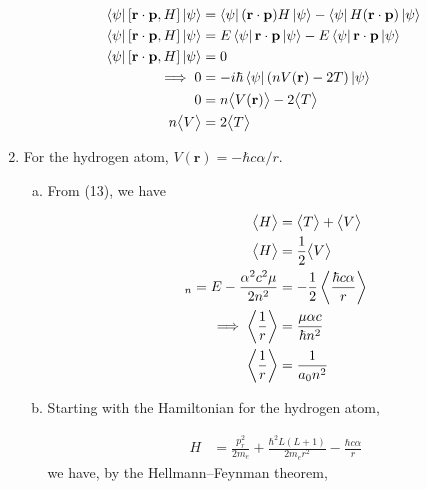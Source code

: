 \documentclass[]{article}
\begin{document}
\begin{enumerate}[1)]
\begin{equation}
\begin{split}
\bra{\psi}\left[ \textbf{r}\cdot\textbf{p}, H  \right]\ket{\psi} & =  \bra{\psi}(\textbf{r}\cdot\textbf{p})H\ket{\psi}   -  \bra{\psi}H(\textbf{r}\cdot\textbf{p})\ket{\psi}  \\
\bra{\psi}\left[ \textbf{r}\cdot\textbf{p}, H  \right]\ket{\psi} & = E\bra{\psi}\textbf{r}\cdot\textbf{p}\ket{\psi}   -  E\bra{\psi}\textbf{r}\cdot\textbf{p}\ket{\psi}  \\
\bra{\psi}\left[ \textbf{r}\cdot\textbf{p}, H  \right]\ket{\psi} & = 0\\
\implies 0 & = -i\hbar \bra{\psi}\left( nV(\textbf{r})  -2 T \right) \ket{\psi}\\
0 & = n \big< V(\textbf{r}) \big> -2 \big<  T \big> \\
 n \big< V \big> & = 2 \big<  T \big>
\end{split}
\end{equation}

\item For the hydrogen atom, $V(\textbf{r}) = -\hbar c\alpha/r$.
\begin{enumerate}[a)]
\item From (13), we have

\begin{equation}
\begin{split}
\big< H \big> & = \big< T \big>  +  \big<  V \big> \\
\big< H \big> & = \frac{1}{2} \big<  V \big> \\
_n = E-\frac{\alpha^2c^2\mu}{2n^2} & = -\frac{1}{2} \expval{ \frac{\hbar c \alpha }{r} } \\
\implies \expval{\frac{1}{r} }  & = \frac{\mu\alpha c}{\hbar n^2} \\
\expval{ \frac{1}{r} } & = \frac{1}{a_0 n^2} \\
\end{split}
\end{equation}

\item Starting with the Hamiltonian for the hydrogen atom,

\begin{equation}
\begin{split}
 H &= \frac{p_r^2}{2m_e} + \frac{\hbar^2L(L+1)}{2m_e r^2} -  \frac{\hbar c \alpha }{r}
\end{split}
\end{equation}
we have, by the Hellmann–Feynman theorem, 


\end{enumerate}
\end{enumerate}
\end{document}
